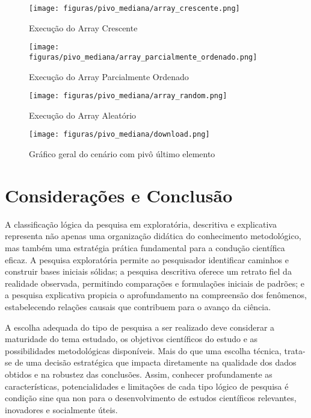 \begin{figure}[H]
    \centering
    \caption{Execução do Array Crescente}
    \texttt{[image: figuras/pivo\_mediana/array\_crescente.png]}
    \label{fig:pivo_ultimo_crescente}
\end{figure}

\begin{figure}[H]
    \centering
    \caption{Execução do Array Parcialmente Ordenado}
    \texttt{[image: figuras/pivo\_mediana/array\_parcialmente\_ordenado.png]}
    \label{fig:pivo_ultimo_parcialmente}
\end{figure}

\begin{figure}[H]
    \centering
    \caption{Execução do Array Aleatório}
    \texttt{[image: figuras/pivo\_mediana/array\_random.png]}
    \label{fig:pivo_ultimo_random}
\end{figure}

\begin{figure}[H]
    \centering
    \caption{Gráfico geral do cenário com pivô último elemento}
    \texttt{[image: figuras/pivo\_mediana/download.png]}
    \label{fig:pivo_ultimo_grafico}
\end{figure}

\section{\esp Considerações e Conclusão}

A classificação lógica da pesquisa em exploratória, descritiva e explicativa representa não apenas uma organização didática do conhecimento metodológico, mas também uma estratégia prática fundamental para a condução científica eficaz. A pesquisa exploratória permite ao pesquisador identificar caminhos e construir bases iniciais sólidas; a pesquisa descritiva oferece um retrato fiel da realidade observada, permitindo comparações e formulações iniciais de padrões; e a pesquisa explicativa propicia o aprofundamento na compreensão dos fenômenos, estabelecendo relações causais que contribuem para o avanço da ciência.

A escolha adequada do tipo de pesquisa a ser realizado deve considerar a maturidade do tema estudado, os objetivos científicos do estudo e as possibilidades metodológicas disponíveis. Mais do que uma escolha técnica, trata-se de uma decisão estratégica que impacta diretamente na qualidade dos dados obtidos e na robustez das conclusões. Assim, conhecer profundamente as características, potencialidades e limitações de cada tipo lógico de pesquisa é condição sine qua non para o desenvolvimento de estudos científicos relevantes, inovadores e socialmente úteis.

\nocite{artigo01}
\nocite{artigo02}
\nocite{artigo03}
\nocite{videoaula}
